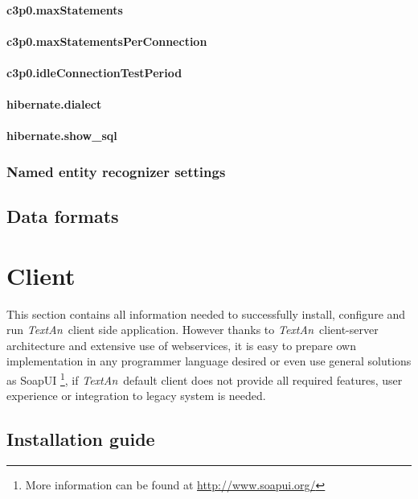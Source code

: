 \documentclass[12pt,a4paper]{report}
\newcommand{\textan}{\emph{TextAn}}
\begin{document}
\paragraph{c3p0.maxStatements}

\paragraph{c3p0.maxStatementsPerConnection}

\paragraph{c3p0.idleConnectionTestPeriod}

\paragraph{hibernate.dialect}

\paragraph{hibernate.show\_sql}

\subsubsection{Named entity recognizer settings}

\subsection{Data formats}

\section{Client}

This section contains all information needed to successfully install, configure and run \textan\ client side application.
However thanks to \textan\ client-server architecture and extensive use of webservices,
it is easy to prepare own implementation in any programmer language desired or even use general solutions as SoapUI
\footnote{More information can be found at \url{http://www.soapui.org/}},
if \textan\ default client does not provide all required features, user experience or integration to legacy system is needed.

\subsection{Installation guide}
\end{document}
